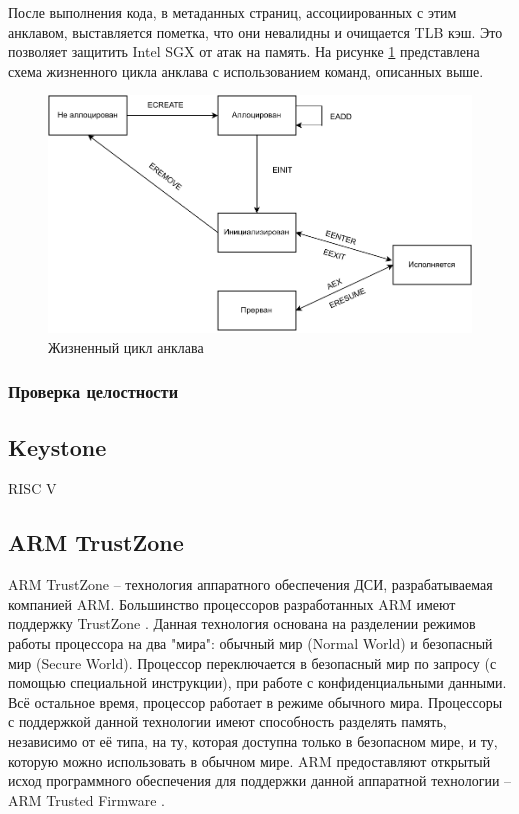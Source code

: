 После выполнения кода, в метаданных страниц, ассоциированных с этим анклавом, выставляется пометка, что они невалидны и очищается TLB кэш. Это позволяет защитить Intel SGX от атак на память. На рисунке \ref{fig:enclave-life} представлена схема жизненного цикла анклава с использованием команд, описанных выше.

\begin{figure}[h]
	\centering
	\includegraphics[width=\textwidth]{img/enclave-life-cycle.pdf}
	\caption{Жизненный цикл анклава}
	\label{fig:enclave-life}
\end{figure}

\subsubsection{Проверка целостности}

\subsection{Keystone}

RISC V

\subsection{ARM TrustZone}

ARM TrustZone -- технология аппаратного обеспечения ДСИ, разрабатываемая компанией ARM. Большинство процессоров разработанных ARM имеют поддержку TrustZone \cite{comparsion-arm-intel}. Данная технология основана на разделении режимов работы процессора на два "мира": обычный мир (Normal World) и безопасный мир (Secure World). Процессор переключается в безопасный мир по запросу (с помощью специальной инструкции), при работе с конфиденциальными данными. Всё остальное время, процессор работает в режиме обычного мира. Процессоры с поддержкой данной технологии имеют способность разделять память, независимо от её типа, на ту, которая доступна только в безопасном мире, и ту, которую можно использовать в обычном мире. ARM предоставляют открытый исход программного обеспечения для поддержки данной аппаратной технологии -- ARM Trusted Firmware \cite{arm-tfa}.

